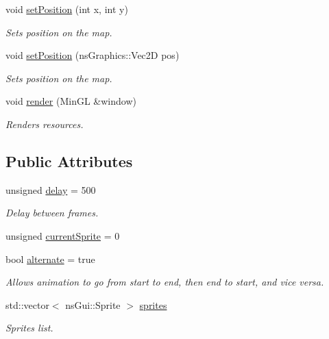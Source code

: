 \begin{DoxyCompactItemize}
void \hyperlink{classns_game_1_1_animation_a1a103b09407581b74933001fb8b3a8f0}{set\+Position} (int x, int y)
\begin{DoxyCompactList}\small\item\em Sets position on the map. \end{DoxyCompactList}\item 
void \hyperlink{classns_game_1_1_animation_a2dc40787df4708e3f5d81e5529595574}{set\+Position} (ns\+Graphics\+::\+Vec2D pos)
\begin{DoxyCompactList}\small\item\em Sets position on the map. \end{DoxyCompactList}\item 
void \hyperlink{classns_game_1_1_animation_a348e25058d77891160c015da88ea4837}{render} (Min\+GL \&window)
\begin{DoxyCompactList}\small\item\em Renders resources. \end{DoxyCompactList}\end{DoxyCompactItemize}
\subsection*{Public Attributes}
\begin{DoxyCompactItemize}
\item 
unsigned \hyperlink{classns_game_1_1_animation_abde2f282d6d865a253f0a6edc0964508}{delay} = 500
\begin{DoxyCompactList}\small\item\em Delay between frames. \end{DoxyCompactList}\item 
unsigned \hyperlink{classns_game_1_1_animation_a2cb68d312de6b044102c6a1e65221eb3}{current\+Sprite} = 0
\item 
bool \hyperlink{classns_game_1_1_animation_a3f119a84e6993f0676c9cde2b84a61dd}{alternate} = true
\begin{DoxyCompactList}\small\item\em Allows animation to go from start to end, then end to start, and vice versa. \end{DoxyCompactList}\item 
std\+::vector$<$ ns\+Gui\+::\+Sprite $>$ \hyperlink{classns_game_1_1_animation_a1757a8a9ce0a3fc6a75b1289b78753bb}{sprites}
\begin{DoxyCompactList}\small\item\em Sprites list. \end{DoxyCompactList}\end{DoxyCompactItemize}


